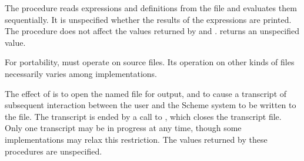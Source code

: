 \begin{entry}{%
}


 The  procedure reads
expressions and definitions from the file and evaluates them
sequentially.  It is unspecified whether the results of the expressions
are printed.  The  procedure does not affect the values
returned by  and .
 returns an unspecified value.

\begin{rationale}
For portability,  must operate on source files.
Its operation on other kinds of files necessarily varies among
implementations.
\end{rationale}
\end{entry}


\begin{entry}{%
\nopagebreak{}
}

 The effect of  is to open the named file
for output, and to cause a transcript of subsequent interaction between
the user and the Scheme system to be written to the file.  The
transcript is ended by a call to , which closes the
transcript file.  Only one transcript may be in progress at any time,
though some implementations may relax this restriction.  The values
returned by these procedures are unspecified.

\end{entry}
